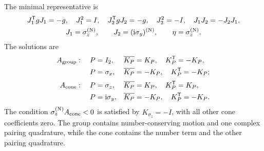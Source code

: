 The minimal representative is
\begin{equation}
\begin{gathered}
J_1^{\mathsf{T}} gJ_1=-g,\quad J_1^2=I,\quad
J_2^{\mathsf{T}} gJ_2=-g,\quad J_2^2=-I,\quad
J_1J_2=-J_2J_1,\\
J_1=\sigma_z^{({\rm N})},\qquad J_2=(\mathrm{i}\sigma_y)^{({\rm N})},\qquad \eta=\sigma_z^{({\rm N})}.
\end{gathered}
\end{equation}
The solutions are
\begin{align*}
A_{\rm group}:\quad
P&=I_2,&&\overline{K_P}=K_P,\quad K_P^{\mathsf{T}}=-K_P,\\
P&=\sigma_x,&&\overline{K_P}=-K_P,\quad K_P^{\mathsf{T}}=-K_P;\\[2pt]
A_{\rm cone}:\quad
P&=\sigma_z,&&\overline{K_P}=K_P,\quad K_P^{\mathsf{T}}=K_P,\\
P&=\mathrm{i}\sigma_y,&&\overline{K_P}=-K_P,\quad K_P^{\mathsf{T}}=-K_P.
\end{align*}
The condition \(\sigma_z^{({\rm N})}A_{\rm cone}<0\) is satisfied by
\(K_{\sigma_z}=-I\), with all other cone coefficients zero.  The group contains number-conserving motion and one complex pairing quadrature, while the cone contains the number term and the other pairing quadrature.

